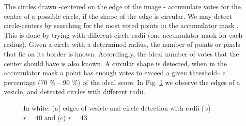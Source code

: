 \documentclass[oribibl]{llncs}
\begin{document}
The circles drawn -centered on the edge of the image - accumulate votes for the centre of a possible circle, if the shape of the edge is circular. %
We may detect circle-centers by searching for the most voted points in the accumulator mask \cite{SJ01}. This is done by trying with different circle radii (one accumulator 
mask for each radius). Given a circle with a determined radius, the number of points or pixels that lie on its border is known. Accordingly, the ideal number of votes that the center should have is also known. 
A circular shape is detected, when in the accumulator mask a  point has enough votes to exceed a given threshold-- a percentage (70 \% -- 90 \%) of the ideal score. 
In Fig. \ref{fig:deteccionRadios4043} we observe the edges of a vesicle, and detected circles with different radii. 
\begin{figure}[ht]
\centering
 \hspace{0.1pt}
 \hspace{5pt}%
 \caption{In white: (a) edges of vesicle and circle detection with radii (b) $r = 40$ and (c) $r = 43$.  \label{fig:deteccionRadios4043}}
\end{figure}
\end{document}

